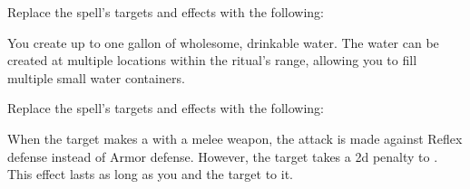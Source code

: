 


Replace the spell's targets and effects with the following:
\begin{spellcontent}

\begin{augmenttargetinginfo}




\end{augmenttargetinginfo}


\begin{augmenteffects}



\spelleffect
You create up to one gallon of wholesome, drinkable water.
The water can be created at multiple locations within the ritual's range, allowing you to fill multiple small water containers.








\end{augmenteffects}

\end{spellcontent}








Replace the spell's targets and effects with the following:
\begin{spellcontent}

\begin{augmenttargetinginfo}



\end{augmenttargetinginfo}


\begin{augmenteffects}



\spelleffect
When the target makes a  with a melee weapon, the attack is made against Reflex defense instead of Armor defense.
However, the target takes a \minus2d penalty to .
This effect lasts as long as you and the target  to it.








\end{augmenteffects}

\end{spellcontent}





